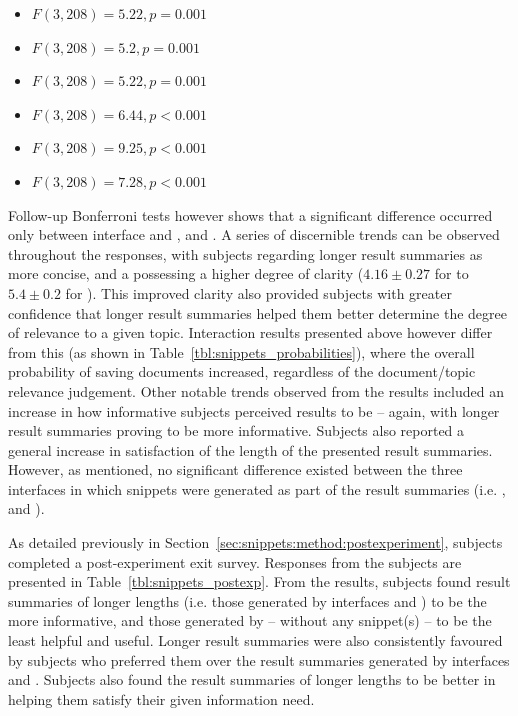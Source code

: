 \begin{itemize}
    \item{ $F(3,208)=5.22, p=0.001$}
    \item{ $F(3,208)=5.2, p=0.001$}
    \item{ $F(3,208)=5.22, p=0.001$}
    \item{ $F(3,208)=6.44, p<0.001$}
    \item{ $F(3,208)=9.25, p<0.001$}
    \item{ $F(3,208)=7.28, p<0.001$}
\end{itemize}

Follow-up Bonferroni tests however shows that a significant difference occurred only between interface  and ,  and . A series of discernible trends can be observed throughout the responses, with subjects regarding longer result summaries as more concise, and a possessing a higher degree of clarity ($4.16\pm0.27$ for  to $5.4\pm0.2$ for ). This improved clarity also provided subjects with greater confidence that longer result summaries helped them better determine the degree of relevance to a given topic. Interaction results presented above however differ from this (as shown in Table~\ref{tbl:snippets_probabilities}), where the overall probability of saving documents increased, regardless of the document/topic relevance judgement. Other notable trends observed from the results included an increase in how informative subjects perceived results to be -- again, with longer result summaries proving to be more informative. Subjects also reported a general increase in satisfaction of the length of the presented result summaries. However, as mentioned, no significant difference existed between the three interfaces in which snippets were generated as part of the result summaries (i.e. ,  and ).

As detailed previously in Section~\ref{sec:snippets:method:postexperiment}, subjects completed a post-experiment exit survey. Responses from the subjects are presented in Table~\ref{tbl:snippets_postexp}. From the results, subjects found result summaries of longer lengths (i.e. those generated by interfaces  and ) to be the more informative, and those generated by  -- without any snippet(s) -- to be the least helpful and useful. Longer result summaries were also consistently favoured by subjects who preferred them over the result summaries generated by interfaces  and . Subjects also found the result summaries of longer lengths to be better in helping them satisfy their given information need.

